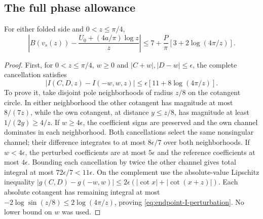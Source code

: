 \subsection{The full phase allowance}

\begin{lemma}\label{lem:endpoint-envelope}
For either folded side and $0<z\leq\pi/4$,
\begin{equation}\label{eq:endpoint-envelope}
 \left|B(v_s(z))-\frac{U_0+(4a/\pi)\log z}{z}\right|
          \leq7+\frac P\pi[3+2\log(4\pi/z)].
\end{equation}
\end{lemma}
\begin{proof}
First, for $0<z\leq\pi/4$, $w\geq0$ and
$|C+w|,|D-w|\leq\epsilon$, the complete cancellation satisfies
\begin{equation}\label{eq:endpoint-I-perturbation}
 |I(C,D,z)-I(-w,w,z)|\leq\epsilon[11+8\log(4\pi/z)].
\end{equation}
To prove it, take disjoint pole neighborhoods of radius $z/8$ on the
cotangent circle. In either neighborhood the other cotangent has
magnitude at most $8/(7z)$, while the own cotangent, at distance
$y\leq z/8$, has magnitude at least $1/(2y)\geq4/z$.
If $w\geq4\epsilon$, the coefficient signs are preserved and the own
channel dominates in each neighborhood. Both cancellations select
the same nonsingular channel; their difference integrates to at most
$8\epsilon/7$ over both neighborhoods. If $w<4\epsilon$, the
perturbed coefficients are at most $5\epsilon$ and the reference
coefficients at most $4\epsilon$. Bounding each cancellation by twice
the other channel gives total integral at most
$72\epsilon/7<11\epsilon$. On the complement use the absolute-value
Lipschitz inequality
$|g(C,D)-g(-w,w)|\leq2\epsilon(|\cot x|+|\cot(x+z)|)$.
Each absolute cotangent has remaining integral at most
$-2\log\sin(z/8)\leq2\log(4\pi/z)$, proving
\eqref{eq:endpoint-I-perturbation}. No lower bound on $w$ was used.


\end{proof}
